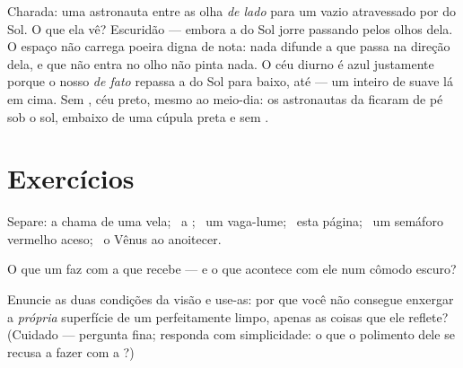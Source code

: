 \begin{remark}\label{rem:g7:light-sources-propagation:space}
Charada: uma astronauta entre as  olha \emph{de lado} para um
vazio atravessado por  do Sol. O que ela vê? Escuridão --- embora
a  do Sol jorre passando pelos olhos dela. O espaço não carrega
poeira digna de nota: nada difunde a  que passa na direção dela, e
 que não entra no olho não pinta nada. O céu diurno é azul
justamente porque o nosso  \emph{de fato} repassa a  do Sol para
baixo, até  --- um  inteiro de  suave lá em cima.
Sem , céu preto, mesmo ao meio-dia: os astronautas da  ficaram
de pé sob o sol, embaixo de uma cúpula preta e sem .
\end{remark}

\section{Exercícios}

\begin{exercise}[$\star$]\label{exo:g7:light-sources-propagation:1}
Separe: a chama de uma vela; \ a ; \ um vaga-lume; \ esta página;
\ um semáforo vermelho aceso; \ o  Vênus ao anoitecer.
\end{exercise}

\begin{exercise}[$\star$]\label{exo:g7:light-sources-propagation:2}
O que um  faz com a  que recebe --- e o que acontece
com ele num cômodo escuro?
\end{exercise}

\begin{exercise}[$\star$]\label{exo:g7:light-sources-propagation:3}
Enuncie as duas condições da visão e use-as: por que você não
consegue enxergar a \emph{própria} superfície de um 
perfeitamente limpo, apenas as coisas que ele reflete? (Cuidado ---
pergunta fina; responda com simplicidade: o que o polimento dele se
recusa a fazer com a ?)
\end{exercise}


